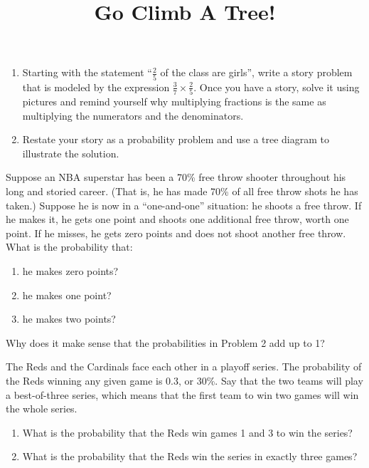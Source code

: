 \documentclass{ximera}
\title{Go Climb A Tree!}
\begin{document}
\begin{abstract}
\end{abstract}
\maketitle



\begin{problem}
\begin{enumerate}
\item Starting with the statement ``$\frac25$ of the class are girls'', write a story problem that is modeled by the expression $\frac37 \times \frac25$.  Once you have a story, solve it using pictures and remind yourself why multiplying fractions is the same as multiplying the numerators and the denominators.
\item Restate your story as a probability problem and use a tree diagram to illustrate the solution.
\end{enumerate}
\end{problem}

\begin{problem}\label{NBAStar}
Suppose an NBA superstar has been a 70\% free throw shooter throughout his long and storied career.  (That is, he has made 70\% of all free throw shots he has taken.)  Suppose he is now in a ``one-and-one'' situation: he shoots a free throw.  If he makes it, he gets one point and shoots one additional free throw, worth one point.  If he misses, he gets zero points and does not shoot another free throw.  What is the probability that:
\begin{enumerate}
\item he makes zero points?
\item he makes one point?
\item he makes two points?
\end{enumerate}
\end{problem}

\begin{problem}
Why does it make sense that the probabilities in Problem 2 add up to 1?
\end{problem}

\begin{problem}
The Reds and the Cardinals face each other in a playoff series.  The probability of the Reds winning any given game is 0.3, or 30\%.  Say that the two teams will play a best-of-three series, which means that the first team to win two games will win the whole series.

\begin{enumerate}
\item What is the probability that the Reds win games 1 and 3 to win the series?
\item What is the probability that the Reds win the series in exactly three games?
\end{enumerate}
\end{problem}
\end{document}
